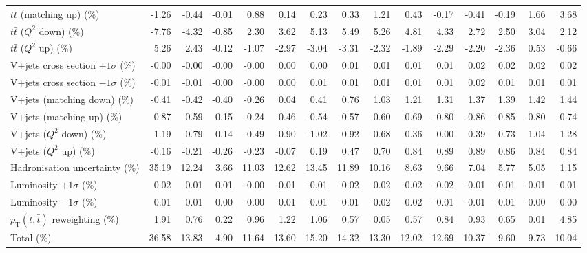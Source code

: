 \begin{table}[htbp]
{\begin{tabular}{lrrrrrrrrrrrrrr}
$t\bar{t}$ (matching up) (\%) & -1.26 & -0.44 & -0.01 & 0.88 & 0.14 & 0.23 & 0.33 & 1.21 & 0.43 & -0.17 & -0.41 & -0.19 & 1.66 & 3.68 \\ 
$t\bar{t}$ ($Q^{2}$ down) (\%) & -7.76 & -4.32 & -0.85 & 2.30 & 3.62 & 5.13 & 5.49 & 5.26 & 4.81 & 4.33 & 2.72 & 2.50 & 3.04 & 2.12 \\ 
$t\bar{t}$ ($Q^{2}$ up) (\%) & 5.26 & 2.43 & -0.12 & -1.07 & -2.97 & -3.04 & -3.31 & -2.32 & -1.89 & -2.29 & -2.20 & -2.36 & 0.53 & -0.66 \\ 
V+jets cross section \ensuremath{+1\sigma} (\%) & -0.00 & -0.00 & -0.00 & -0.00 & 0.00 & 0.00 & 0.01 & 0.01 & 0.01 & 0.01 & 0.02 & 0.02 & 0.02 & 0.02 \\ 
V+jets cross section \ensuremath{-1\sigma} (\%) & -0.01 & -0.01 & -0.00 & -0.00 & 0.00 & 0.01 & 0.01 & 0.01 & 0.01 & 0.01 & 0.02 & 0.01 & 0.01 & 0.01 \\ 
V+jets (matching down) (\%) & -0.41 & -0.42 & -0.40 & -0.26 & 0.04 & 0.41 & 0.76 & 1.03 & 1.21 & 1.31 & 1.37 & 1.39 & 1.42 & 1.44 \\ 
V+jets (matching up) (\%) & 0.87 & 0.59 & 0.15 & -0.24 & -0.46 & -0.54 & -0.57 & -0.60 & -0.69 & -0.80 & -0.86 & -0.85 & -0.80 & -0.74 \\ 
V+jets ($Q^{2}$ down) (\%) & 1.19 & 0.79 & 0.14 & -0.49 & -0.90 & -1.02 & -0.92 & -0.68 & -0.36 & 0.00 & 0.39 & 0.73 & 1.04 & 1.28 \\ 
V+jets ($Q^{2}$ up) (\%) & -0.16 & -0.21 & -0.26 & -0.23 & -0.07 & 0.19 & 0.47 & 0.70 & 0.84 & 0.89 & 0.89 & 0.86 & 0.84 & 0.84 \\ 
Hadronisation uncertainty (\%) & 35.19 & 12.24 & 3.66 & 11.03 & 12.62 & 13.45 & 11.89 & 10.16 & 8.63 & 9.66 & 7.04 & 5.77 & 5.05 & 1.15 \\ 
Luminosity $+1\sigma$ (\%) & 0.02 & 0.01 & 0.01 & -0.00 & -0.01 & -0.01 & -0.02 & -0.02 & -0.02 & -0.02 & -0.01 & -0.01 & -0.01 & -0.01 \\ 
Luminosity $-1\sigma$ (\%) & 0.01 & 0.01 & 0.00 & -0.00 & -0.01 & -0.01 & -0.01 & -0.02 & -0.02 & -0.01 & -0.01 & -0.01 & -0.00 & -0.00 \\ 
$p_\mathrm{T}(t,\bar{t})$ reweighting (\%) & 1.91 & 0.76 & 0.22 & 0.96 & 1.22 & 1.06 & 0.57 & 0.05 & 0.57 & 0.84 & 0.93 & 0.65 & 0.01 & 4.85 \\ 
\hline 
Total (\%) & 36.58  & 13.83  & 4.90  & 11.64  & 13.60  & 15.20  & 14.32  & 13.30  & 12.02  & 12.69  & 10.37  & 9.60  & 9.73  & 10.04 \\ 
\hline 
\end{tabular}
}
\end{table}
